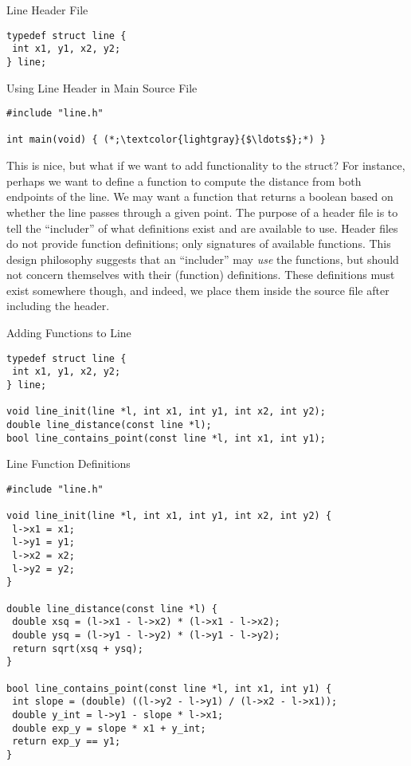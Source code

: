 \begin{cl}[line.h]{Line Header File}
\begin{lstlisting}[language=MyC]
typedef struct line {
 int x1, y1, x2, y2;
} line;
\end{lstlisting}
\end{cl}

\begin{cl}[main.c]{Using Line Header in Main Source File}
\begin{lstlisting}[language=MyC]
#include "line.h"

int main(void) { (*;\textcolor{lightgray}{$\ldots$};*) }
\end{lstlisting}
\end{cl}

This is nice, but what if we want to add  functionality to the  struct? For instance, perhaps we want to define a  function to compute the distance from both endpoints of the line. We may want a function that returns a boolean based on whether the line passes through a given point. The purpose of a header file is to tell the ``includer'' of what definitions exist and are available to use. Header files do not provide function definitions; only signatures of available functions. This design philosophy suggests that an ``includer'' may \textit{use} the functions, but should not concern themselves with their (function) definitions. These definitions must exist somewhere though, and indeed, we place them inside the  source file after including the  header.

\begin{cl}[line.h]{Adding Functions to Line}
\begin{lstlisting}[language=MyC]
typedef struct line {
 int x1, y1, x2, y2;
} line;

void line_init(line *l, int x1, int y1, int x2, int y2);
double line_distance(const line *l);
bool line_contains_point(const line *l, int x1, int y1);
\end{lstlisting}
\end{cl}

\begin{cl}[line.c]{Line Function Definitions}
\begin{lstlisting}[language=MyC]
#include "line.h"

void line_init(line *l, int x1, int y1, int x2, int y2) {
 l->x1 = x1;
 l->y1 = y1;
 l->x2 = x2;
 l->y2 = y2;
}

double line_distance(const line *l) {
 double xsq = (l->x1 - l->x2) * (l->x1 - l->x2);
 double ysq = (l->y1 - l->y2) * (l->y1 - l->y2);
 return sqrt(xsq + ysq);
}

bool line_contains_point(const line *l, int x1, int y1) {
 int slope = (double) ((l->y2 - l->y1) / (l->x2 - l->x1));
 double y_int = l->y1 - slope * l->x1;
 double exp_y = slope * x1 + y_int;
 return exp_y == y1;
}
\end{lstlisting}
\end{cl}

